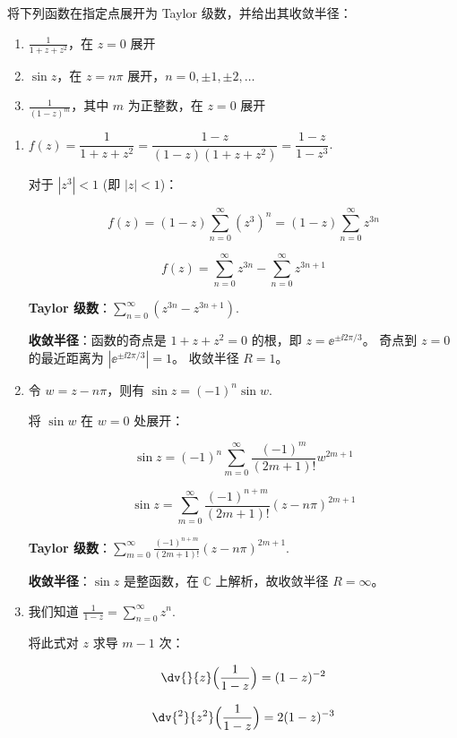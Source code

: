 \begin{question}
将下列函数在指定点展开为 Taylor 级数，并给出其收敛半径：
\begin{enumerate}
  \item \(\displaystyle\frac1{1+z+z^2}\)，在 \(z=0\) 展开
  \item \(\sin z\)，在 \(z=n\pi\) 展开，\(n=0,\pm1,\pm2,\dots\)
  \item \(\displaystyle\frac1{(1-z)^m}\)，其中 \(m\) 为正整数，在 \(z=0\) 展开
\end{enumerate}

\begin{solution}
\begin{enumerate}
  \item
    \(f(z)=\dfrac1{1+z+z^2}=\dfrac{1-z}{(1-z)(1+z+z^2)}=\dfrac{1-z}{1-z^3}\).

    对于 \(|z^3|<1\) (即 \(|z|<1\))：

    \[
    f(z)=(1-z)\sum_{n=0}^{\infty} (z^3)^n = (1-z)\sum_{n=0}^{\infty} z^{3n}
    \]

    \[
    f(z)=\sum_{n=0}^{\infty} z^{3n} - \sum_{n=0}^{\infty} z^{3n+1}
    \]

    \textbf{Taylor 级数}：\(\displaystyle\sum_{n=0}^{\infty} (z^{3n} - z^{3n+1})\).

    \textbf{收敛半径}：函数的奇点是 \(1+z+z^2=0\) 的根，即 \(z=\ee^{\pm\ii 2\pi/3}\)。
    奇点到 \(z=0\) 的最近距离为 \(|\ee^{\pm\ii 2\pi/3}|=1\)。
    收敛半径 \(R=1\)。
  \item
    令 \(w=z-n\pi\)，则有 \(\sin z = (-1)^n\sin w\).

    将 \(\sin w\) 在 \(w=0\) 处展开：

    \[
    \sin z = (-1)^n \sum_{m=0}^{\infty} \frac{(-1)^m}{(2m+1)!} w^{2m+1}
    \]

    \[
    \sin z = \sum_{m=0}^{\infty} \frac{(-1)^{n+m}}{(2m+1)!} (z-n\pi)^{2m+1}
    \]

    \textbf{Taylor 级数}：\(\displaystyle\sum_{m=0}^{\infty} \frac{(-1)^{n+m}}{(2m+1)!} (z-n\pi)^{2m+1}\).

    \textbf{收敛半径}：\(\sin z\) 是整函数，在 \(\mathbb{C}\) 上解析，故收敛半径 \(R=\infty\)。
  \item
    我们知道 \(\displaystyle\frac1{1-z}=\sum_{n=0}^{\infty} z^n\).

    将此式对 \(z\) 求导 \(m-1\) 次：

    \[
    \dv{}{z}\Bigl(\frac1{1-z}\Bigr) = (1-z)^{-2}
    \]

    \[
    \dv{^2}{z^2}\Bigl(\frac1{1-z}\Bigr) = 2(1-z)^{-3}
    \]


\end{enumerate}
\end{solution}
\end{question}

